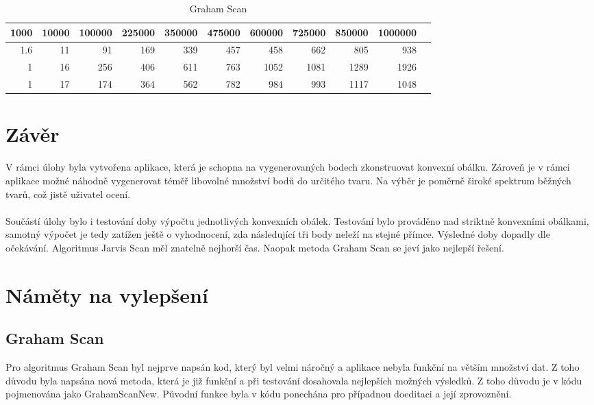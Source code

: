 \documentclass[a4paper, 12pt]{article}
\begin{document}
\begin{table}[h]
	\begin{tabular}{|r|r|r|r|r|r|r|r|r|r|r|}
	\hline
	 \textbf{1000} 	& \textbf{10000} & \textbf{100000} & \textbf{225000} & \textbf{350000} & \textbf{475000} & \textbf{600000}  & \textbf{725000}
 & \textbf{850000}  & \textbf{1000000}\\ \hline
	 1.6  & 11 & 91 & 169 & 339 & 457 & 458 & 662 & 805 & 938   \\ \hline
	 1 & 16 & 256 & 406 & 611 & 763 & 1052 & 1081 & 1289 & 1926 \\ \hline
	 1 & 17 & 174 & 364 & 562 & 782 & 984 & 993 & 1117 & 1048 \\ \hline

	
	\end{tabular}
		\caption{Graham Scan}
\end{table}


\clearpage
\section{Závěr}
V rámci úlohy byla vytvořena aplikace, která je schopna na vygenerovaných bodech zkonstruovat konvexní obálku. Zároveň je v rámci aplikace možné náhodně vygenerovat téměř libovolné množství bodů do určitého tvaru. Na výběr je poměrně široké spektrum běžných tvarů, což jistě uživatel ocení.\\
\\
Součástí úlohy bylo i testování doby výpočtu jednotlivých konvexních obálek. Testování bylo prováděno nad striktně konvexními obálkami, samotný výpočet je tedy zatížen ještě o vyhodnocení, zda následující tři body neleží na stejné přímce. Výsledné doby dopadly dle očekávání. Algoritmus Jarvis Scan měl znatelně nejhorší čas. Naopak metoda Graham Scan se jeví jako nejlepší řešení.

\section{Náměty na vylepšení}
\subsection{Graham Scan}
Pro algoritmus Graham Scan byl nejprve napsán kod, který byl velmi náročný a aplikace nebyla funkční na větším množství dat. Z toho důvodu byla napsána nová metoda, která je již funkční a při testování dosahovala nejlepších možných výsledků. Z toho důvodu je v kódu pojmenována jako GrahamScanNew. Původní funkce byla v kódu ponechána pro případnou doeditaci a její zprovoznění.
\end{document}
